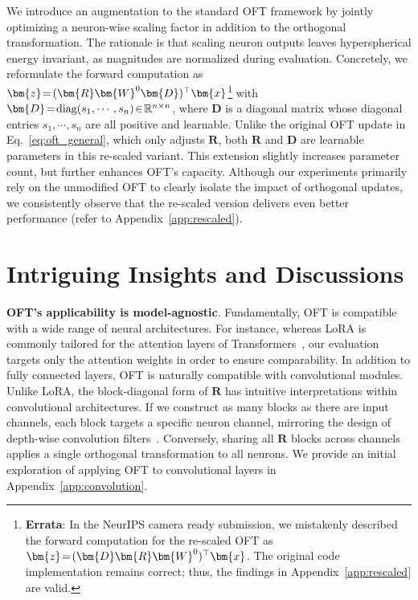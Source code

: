 We introduce an augmentation to the standard OFT framework by jointly optimizing a neuron-wise scaling factor in addition to the orthogonal transformation. The rationale is that scaling neuron outputs leaves hyperspherical energy invariant, as magnitudes are normalized during evaluation. Concretely, we reformulate the forward computation as $\thickmuskip=2mu \medmuskip=2mu\bm{z}=(\bm{R}\bm{W}^0\bm{D})^\top\bm{x}$\footnote{\textbf{Errata}: In the NeurIPS camera ready submission, we mistakenly described the forward computation for the re-scaled OFT as $\thickmuskip=2mu \medmuskip=2mu\bm{z}=(\bm{D}\bm{R}\bm{W}^0)^\top\bm{x}$. The original code implementation remains correct; thus, the findings in Appendix~\ref{app:rescaled} are valid.} with $\thickmuskip=2mu \medmuskip=2mu \bm{D}=\text{diag}(s_1,\cdots,s_n)\in\mathbb{R}^{n\times n}$, where $\bm{D}$ is a diagonal matrix whose diagonal entries $s_1,\cdots,s_n$ are all positive and learnable. Unlike the original OFT update in Eq.~\eqref{eq:oft_general}, which only adjusts $\bm{R}$, both $\bm{R}$ and $\bm{D}$ are learnable parameters in this re-scaled variant. This extension slightly increases parameter count, but further enhances OFT's capacity. Although our experiments primarily rely on the unmodified OFT to clearly isolate the impact of orthogonal updates, we consistently observe that the re-scaled version delivers even better performance (refer to Appendix~\ref{app:rescaled}).

\section{Intriguing Insights and Discussions}

\textbf{OFT's applicability is model-agnostic}. Fundamentally, OFT is compatible with a wide range of neural architectures. For instance, whereas LoRA is commonly tailored for the attention layers of Transformers~\cite{hulora2022}, our evaluation targets only the attention weights in order to ensure comparability. In addition to fully connected layers, OFT is naturally compatible with convolutional modules. Unlike LoRA, the block-diagonal form of $\bm{R}$ has intuitive interpretations within convolutional architectures. If we construct as many blocks as there are input channels, each block targets a specific neuron channel, mirroring the design of depth-wise convolution filters~\cite{chollet2017xception}. Conversely, sharing all $\bm{R}$ blocks across channels applies a single orthogonal transformation to all neurons. We provide an initial exploration of applying OFT to convolutional layers in Appendix~\ref{app:convolution}.

